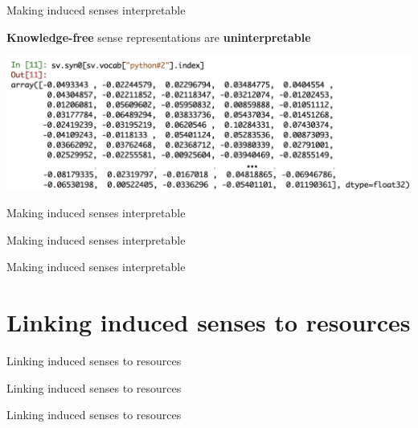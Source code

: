 \documentclass[usenames,dvipsnames]{beamer}
\begin{document}
\begin{frame}{ Making induced senses interpretable }

\vspace{-1em}

\textbf{Knowledge-free} sense representations are \alert{\textbf{uninterpretable}}
	\begin{center}
	\includegraphics[width=1.\textwidth]{numpy}
	\end{center}

	
\end{frame}


\begin{frame}{ Making induced senses interpretable }
	
\end{frame}


\begin{frame}{ Making induced senses interpretable }
	
\end{frame}


\begin{frame}{ Making induced senses interpretable }
	
\end{frame}


\section{Linking induced senses to resources}

\begin{frame}{ Linking induced senses to resources }
	
\end{frame}


\begin{frame}{ Linking induced senses to resources }
	
\end{frame}


\begin{frame}{ Linking induced senses to resources }
	
\end{frame}
\end{document}
